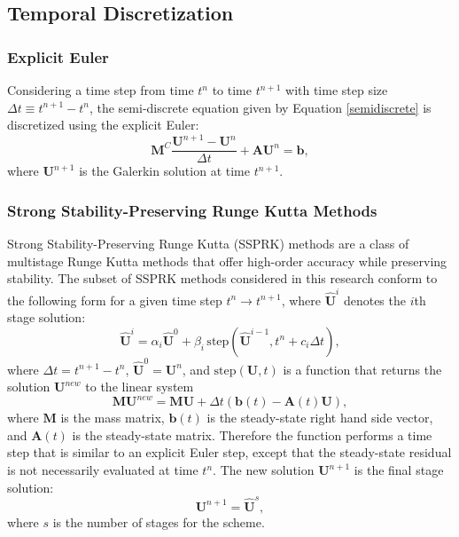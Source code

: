 \subsection{Temporal Discretization}
\subsubsection{Explicit Euler}
Considering a time step from time $t^n$ to time $t^{n+1}$ with time step size
$\Delta t\equiv t^{n+1}-t^n$, the semi-discrete equation given by Equation
\eqref{semidiscrete} is discretized using the explicit Euler:
\begin{equation}\label{exgalerkin}
   \mathbf{M}^C\frac{\mathbf{U}^{n+1}-\mathbf{U}^n}{\Delta t}
     + \mathbf{A}\mathbf{U}^n = \mathbf{b},
\end{equation}
where $\mathbf{U}^{n+1}$ is the Galerkin solution at time $t^{n+1}$.
\subsubsection{Strong Stability-Preserving Runge Kutta Methods}\label{ssprk}
Strong Stability-Preserving Runge Kutta (SSPRK) methods are a class of multistage
Runge Kutta methods that offer high-order accuracy while preserving stability.
The subset of SSPRK methods considered in this research conform to the
following form for a given time step $t^n\rightarrow t^{n+1}$,
where $\hat{\mathbf{U}}^i$ denotes the $i$th stage solution:
\begin{equation}
   \hat{\mathbf{U}}^i = \alpha_i\hat{\mathbf{U}}^0
   + \beta_i\,\mbox{step}(\hat{\mathbf{U}}^{i-1},t^n+c_i\Delta t),
\end{equation}
where $\Delta t=t^{n+1}-t^n$, $\hat{\mathbf{U}}^0=\mathbf{U}^n$,
and $\mbox{step}(\mathbf{U},t)$
is a function that returns the solution $\mathbf{U}^{new}$ to the linear system
\begin{equation}
   \mathbf{M}\mathbf{U}^{new} = \mathbf{M}\mathbf{U}
   + \Delta t(\mathbf{b}(t) - \mathbf{A}(t)\mathbf{U}),
\end{equation}
where $\mathbf{M}$ is the mass matrix, $\mathbf{b}(t)$ is the steady-state
right hand side vector, and $\mathbf{A}(t)$ is the steady-state matrix.
Therefore the function performs a time step that is similar to an
explicit Euler step, except that the steady-state residual is not
necessarily evaluated at time $t^n$. The new solution $\mathbf{U}^{n+1}$
is the final stage solution:
\begin{equation}
   \mathbf{U}^{n+1} = \hat{\mathbf{U}}^s,
\end{equation}
where $s$ is the number of stages for the scheme.

